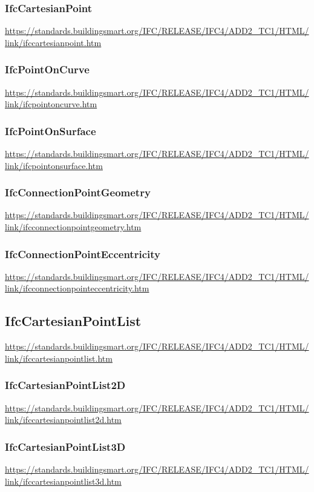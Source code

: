 \documentclass[spanish,12pt,a4paper,final,oneside]{book}
\begin{document}
\subsubsection{IfcCartesianPoint}
\url{https://standards.buildingsmart.org/IFC/RELEASE/IFC4/ADD2_TC1/HTML/link/ifccartesianpoint.htm}

\subsubsection{IfcPointOnCurve}
\url{https://standards.buildingsmart.org/IFC/RELEASE/IFC4/ADD2_TC1/HTML/link/ifcpointoncurve.htm}

\subsubsection{IfcPointOnSurface}
\url{https://standards.buildingsmart.org/IFC/RELEASE/IFC4/ADD2_TC1/HTML/link/ifcpointonsurface.htm}

\subsubsection{IfcConnectionPointGeometry}
\url{https://standards.buildingsmart.org/IFC/RELEASE/IFC4/ADD2_TC1/HTML/link/ifcconnectionpointgeometry.htm}

\subsubsection{IfcConnectionPointEccentricity}
\url{https://standards.buildingsmart.org/IFC/RELEASE/IFC4/ADD2_TC1/HTML/link/ifcconnectionpointeccentricity.htm}


\subsection{IfcCartesianPointList}
\url{https://standards.buildingsmart.org/IFC/RELEASE/IFC4/ADD2_TC1/HTML/link/ifccartesianpointlist.htm}
\subsubsection{IfcCartesianPointList2D}
\url{https://standards.buildingsmart.org/IFC/RELEASE/IFC4/ADD2_TC1/HTML/link/ifccartesianpointlist2d.htm}
\subsubsection{IfcCartesianPointList3D}
\url{https://standards.buildingsmart.org/IFC/RELEASE/IFC4/ADD2_TC1/HTML/link/ifccartesianpointlist3d.htm}
\end{document}
